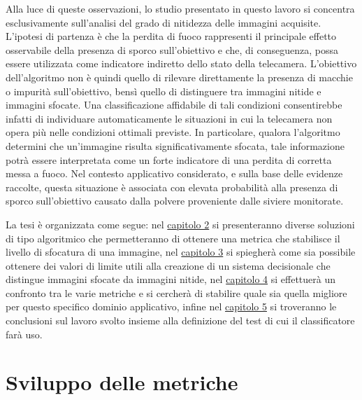 \documentclass[
    target=bach,
    aauheader=,
    style=
]{thud}
\begin{document}
Alla luce di queste osservazioni, lo studio presentato in questo lavoro si concentra esclusivamente sull'analisi del grado di nitidezza delle immagini acquisite. L'ipotesi di partenza è che la perdita di fuoco rappresenti il principale effetto osservabile della presenza di sporco sull'obiettivo e che, di conseguenza, possa essere utilizzata come indicatore indiretto dello stato della telecamera. L'obiettivo dell'algoritmo non è quindi quello di rilevare direttamente la presenza di macchie o impurità sull'obiettivo, bensì quello di distinguere tra immagini nitide e immagini sfocate. Una classificazione affidabile di tali condizioni consentirebbe infatti di individuare automaticamente le situazioni in cui la telecamera non opera più nelle condizioni ottimali previste. In particolare, qualora l'algoritmo determini che un'immagine risulta significativamente sfocata, tale informazione potrà essere interpretata come un forte indicatore di una perdita di corretta messa a fuoco. Nel contesto applicativo considerato, e sulla base delle evidenze raccolte, questa situazione è associata con elevata probabilità alla presenza di sporco sull'obiettivo causato dalla polvere proveniente dalle siviere monitorate.

La tesi è organizzata come segue: nel \hyperref[cap2]{capitolo 2} si presenteranno diverse soluzioni di tipo algoritmico che permetteranno di ottenere una metrica che stabilisce il livello di sfocatura di una immagine, nel \hyperref[cap3]{capitolo 3} si spiegherà come sia possibile ottenere dei valori di limite utili alla creazione di un sistema decisionale che distingue immagini sfocate da immagini nitide, nel \hyperref[cap4]{capitolo 4} si effettuerà un confronto tra le varie metriche e si cercherà di stabilire quale sia quella migliore per questo specifico dominio applicativo, infine nel \hyperref[cap5]{capitolo 5} si troveranno le conclusioni sul lavoro svolto insieme alla definizione del test di cui il classificatore farà uso.


\chapter{Sviluppo delle metriche}
\label{cap2}
\end{document}
